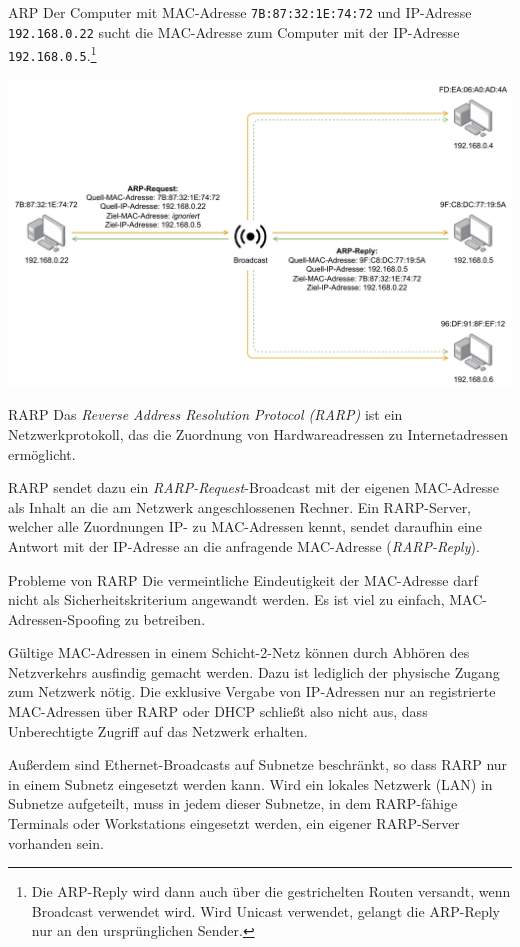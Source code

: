 \begin{example}{ARP}
    Der Computer mit MAC-Adresse \texttt{7B:87:32:1E:74:72} und IP-Adresse \texttt{192.168.0.22} sucht die MAC-Adresse zum Computer mit der IP-Adresse \texttt{192.168.0.5}.\footnote{Die ARP-Reply wird dann auch über die gestrichelten Routen versandt, wenn Broadcast verwendet wird. Wird Unicast verwendet, gelangt die ARP-Reply nur an den ursprünglichen Sender.}

    \centering
    \includegraphics[width=\textwidth]{includes/figures/example_arp.pdf}
\end{example}

\begin{defi}{RARP}
    Das \emph{Reverse Address Resolution Protocol (RARP)} ist ein Netzwerkprotokoll, das die Zuordnung von Hardwareadressen zu Internetadressen ermöglicht.

    RARP sendet dazu ein \emph{RARP-Request}-Broadcast mit der eigenen MAC-Adresse als Inhalt an die am Netzwerk angeschlossenen Rechner.
    Ein RARP-Server, welcher alle Zuordnungen IP- zu MAC-Adressen kennt, sendet daraufhin eine Antwort mit der IP-Adresse an die anfragende MAC-Adresse (\emph{RARP-Reply}).
\end{defi}

\begin{bonus}{Probleme von RARP}
    Die vermeintliche Eindeutigkeit der MAC-Adresse darf nicht als Sicherheitskriterium angewandt werden. Es ist viel zu einfach, MAC-Adressen-Spoofing zu betreiben.

    Gültige MAC-Adressen in einem Schicht-2-Netz können durch Abhören des Netzverkehrs ausfindig gemacht werden. Dazu ist lediglich der physische Zugang zum Netzwerk nötig.
    Die exklusive Vergabe von IP-Adressen nur an registrierte MAC-Adressen über RARP oder DHCP schließt also nicht aus, dass Unberechtigte Zugriff auf das Netzwerk erhalten.

    Außerdem sind Ethernet-Broadcasts auf Subnetze beschränkt, so dass RARP nur in einem Subnetz eingesetzt werden kann.
    Wird ein lokales Netzwerk (LAN) in Subnetze aufgeteilt, muss in jedem dieser Subnetze, in dem RARP-fähige Terminals oder Workstations eingesetzt werden, ein eigener RARP-Server vorhanden sein.
\end{bonus}

